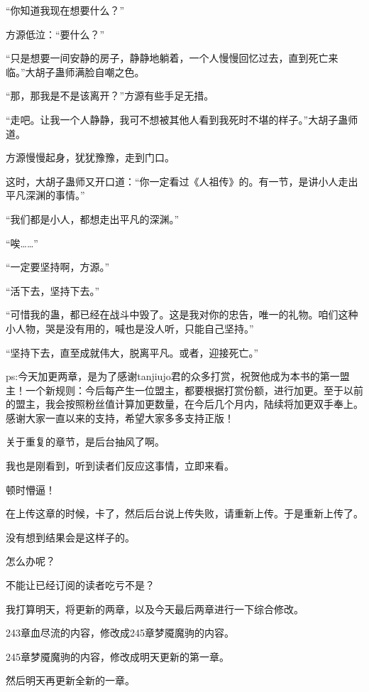 \begin{this_body}
“你知道我现在想要什么？”

方源低泣：“要什么？”

“只是想要一间安静的房子，静静地躺着，一个人慢慢回忆过去，直到死亡来临。”大胡子蛊师满脸自嘲之色。

“那，那我是不是该离开？”方源有些手足无措。

“走吧。让我一个人静静，我可不想被其他人看到我死时不堪的样子。”大胡子蛊师道。

方源慢慢起身，犹犹豫豫，走到门口。

这时，大胡子蛊师又开口道：“你一定看过《人祖传》的。有一节，是讲小人走出平凡深渊的事情。”

“我们都是小人，都想走出平凡的深渊。”

“唉……”

“一定要坚持啊，方源。”

“活下去，坚持下去。”

“可惜我的蛊，都已经在战斗中毁了。这是我对你的忠告，唯一的礼物。咱们这种小人物，哭是没有用的，喊也是没人听，只能自己坚持。”

“坚持下去，直至成就伟大，脱离平凡。或者，迎接死亡。”

ps:今天加更两章，是为了感谢tanjiujo君的众多打赏，祝贺他成为本书的第一盟主！一个新规则：今后每产生一位盟主，都要根据打赏份额，进行加更。至于以前的盟主，我会按照粉丝值计算加更数量，在今后几个月内，陆续将加更双手奉上。感谢大家一直以来的支持，希望大家多多支持正版！

\end{this_body}

关于重复的章节，是后台抽风了啊。

我也是刚看到，听到读者们反应这事情，立即来看。

顿时懵逼！

在上传这章的时候，卡了，然后后台说上传失败，请重新上传。于是重新上传了。

没有想到结果会是这样子的。

怎么办呢？

不能让已经订阅的读者吃亏不是？

我打算明天，将更新的两章，以及今天最后两章进行一下综合修改。

243章血尽流的内容，修改成245章梦魇魔驹的内容。

245章梦魇魔驹的内容，修改成明天更新的第一章。

然后明天再更新全新的一章。

